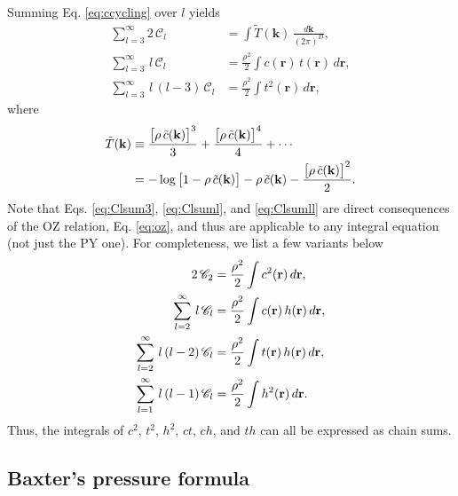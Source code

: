 \documentclass[preprint]{revtex4-1}
\newcommand{\vct}[1]{\mathbf{#1}}
\providecommand{\vr}{} %
\renewcommand{\vr}{\vct{r}}
\newcommand{\vk}{\vct{k}}
\newcommand{\dvk}{\frac{d\vk}{(2\pi)^D}}
\newcommand{\Chn}{\mathscr{C}}
\begin{document}
Summing Eq. \eqref{eq:ccycling} over $l$ yields
%
\begin{align}
      \sum_{l=3}^{\infty} 2 \, \Chn_l
  &=  \int \tilde{T}(\vk) \, \dvk,
     \label{eq:Clsum3} \\
      \sum_{l=3}^{\infty} \, l \, \Chn_l
  &=
      \frac{ \rho^2 }{2} \int c(\vr) \, t(\vr) \, d\vr,
      \label{eq:Clsuml} \\
      \sum_{l=3}^{\infty} \, l \, (l - 3) \, \Chn_l
  &=  \frac{ \rho^2 }{ 2 }
      \int t^2(\vr) \, d\vr,
\label{eq:Clsumll}
\end{align}
%
where
\begin{align}
  \tilde{T}(\vk)
&\equiv
    \frac{ \big[ \rho \, \tilde{c}(\vk) \big]^3 } { 3 }
  + \frac{ \big[ \rho \, \tilde{c}(\vk) \big]^4 } { 4 }
  + \cdots
\notag \\
&=
  - \log\big[1 - \rho \, \tilde{c}(\vk) \big]
  - \rho \, \tilde{c}(\vk)
  - \frac{ \big[ \rho \, \tilde{c}(\vk) \big]^2 } { 2 }.
  \label{eq:logrhoc}
\end{align}
%
Note that Eqs. \eqref{eq:Clsum3}, \eqref{eq:Clsuml}, and \eqref{eq:Clsumll}
  are direct consequences of the OZ relation, Eq. \eqref{eq:oz},
  and thus are applicable to any integral equation (not just the PY one).
%
For completeness, we list a few variants below
%
\begin{align}
      2 \, \Chn_2
  &=
      \frac{ \rho^2 }{2} \int c^2(\vr) \, d\vr,
\notag \\
%
      \sum_{l=2}^{\infty} \, l \, \Chn_l
  &=
      \frac{ \rho^2 }{2} \int c(\vr) \, h(\vr) \, d\vr,
\notag \\
%
      \sum_{l=2}^{\infty} \, l \, (l - 2) \, \Chn_l
  &=  \frac{ \rho^2 }{ 2 }
      \int t(\vr) \, h(\vr) \, d\vr,
\label{eq:Clsum_th} \\
%
      \sum_{l=1}^{\infty} \, l \, (l - 1) \, \Chn_l
  &=  \frac{ \rho^2 }{ 2 }
      \int h^2(\vr) \, d\vr.
\notag
\end{align}
%
Thus, the integrals of $c^2$, $t^2$, $h^2$, $ct$, $ch$, and $th$
can all be expressed as chain sums.



\subsection{Baxter's pressure formula}
\end{document}
